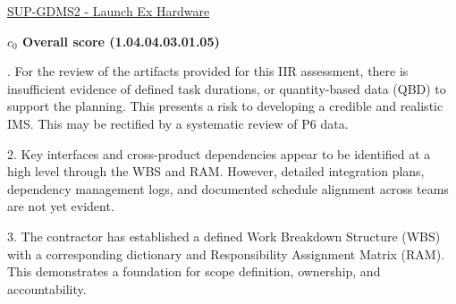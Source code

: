 % 


\begin{frame}{\href{run:../local/source-docs/1.04.04.03.01.05.pdf}{SUP-GDMS2 - Launch Ex Hardware}}
\centering
{}
\par
\vspace{0.75em}
\textbf{\small{\(c_0\) Overall score {\tiny (1.04.04.03.01.05)}}}\\\par
\vspace{0.5em}
\begin{minipage}{0.85\textwidth}
\raggedright
\fontsize{7}{9}. For the review of the artifacts provided for this IIR assessment, there is insufficient evidence of defined task durations, or quantity-based data (QBD) to support the planning. This presents a risk to developing a credible and realistic IMS. This may be rectified by a systematic review of P6 data.\par\vspace{0.5em}2. Key interfaces and cross-product dependencies appear to be identified at a high level through the WBS and RAM. However, detailed integration plans, dependency management logs, and documented schedule alignment across teams are not yet evident.\par\vspace{0.5em}3. The contractor has established a defined Work Breakdown Structure (WBS) with a corresponding dictionary and Responsibility Assignment Matrix (RAM). This demonstrates a foundation for scope definition, ownership, and accountability.\par
\end{minipage}
\end{frame}
